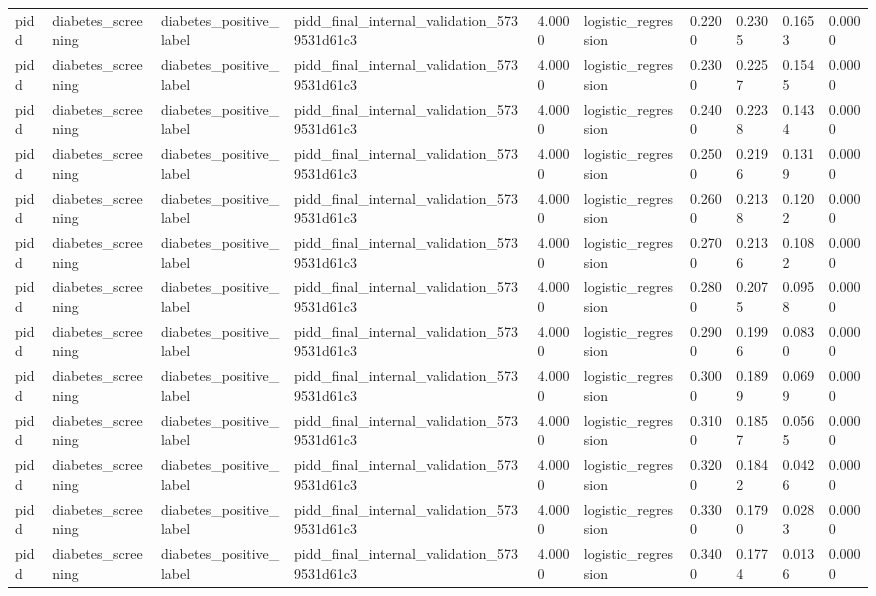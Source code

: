 \begin{tabular}{llllllllll}
pidd & diabetes\_screening & diabetes\_positive\_label & pidd\_final\_internal\_validation\_5739531d61c3 & 4.0000 & logistic\_regression & 0.2200 & 0.2305 & 0.1653 & 0.0000 \\
pidd & diabetes\_screening & diabetes\_positive\_label & pidd\_final\_internal\_validation\_5739531d61c3 & 4.0000 & logistic\_regression & 0.2300 & 0.2257 & 0.1545 & 0.0000 \\
pidd & diabetes\_screening & diabetes\_positive\_label & pidd\_final\_internal\_validation\_5739531d61c3 & 4.0000 & logistic\_regression & 0.2400 & 0.2238 & 0.1434 & 0.0000 \\
pidd & diabetes\_screening & diabetes\_positive\_label & pidd\_final\_internal\_validation\_5739531d61c3 & 4.0000 & logistic\_regression & 0.2500 & 0.2196 & 0.1319 & 0.0000 \\
pidd & diabetes\_screening & diabetes\_positive\_label & pidd\_final\_internal\_validation\_5739531d61c3 & 4.0000 & logistic\_regression & 0.2600 & 0.2138 & 0.1202 & 0.0000 \\
pidd & diabetes\_screening & diabetes\_positive\_label & pidd\_final\_internal\_validation\_5739531d61c3 & 4.0000 & logistic\_regression & 0.2700 & 0.2136 & 0.1082 & 0.0000 \\
pidd & diabetes\_screening & diabetes\_positive\_label & pidd\_final\_internal\_validation\_5739531d61c3 & 4.0000 & logistic\_regression & 0.2800 & 0.2075 & 0.0958 & 0.0000 \\
pidd & diabetes\_screening & diabetes\_positive\_label & pidd\_final\_internal\_validation\_5739531d61c3 & 4.0000 & logistic\_regression & 0.2900 & 0.1996 & 0.0830 & 0.0000 \\
pidd & diabetes\_screening & diabetes\_positive\_label & pidd\_final\_internal\_validation\_5739531d61c3 & 4.0000 & logistic\_regression & 0.3000 & 0.1899 & 0.0699 & 0.0000 \\
pidd & diabetes\_screening & diabetes\_positive\_label & pidd\_final\_internal\_validation\_5739531d61c3 & 4.0000 & logistic\_regression & 0.3100 & 0.1857 & 0.0565 & 0.0000 \\
pidd & diabetes\_screening & diabetes\_positive\_label & pidd\_final\_internal\_validation\_5739531d61c3 & 4.0000 & logistic\_regression & 0.3200 & 0.1842 & 0.0426 & 0.0000 \\
pidd & diabetes\_screening & diabetes\_positive\_label & pidd\_final\_internal\_validation\_5739531d61c3 & 4.0000 & logistic\_regression & 0.3300 & 0.1790 & 0.0283 & 0.0000 \\
pidd & diabetes\_screening & diabetes\_positive\_label & pidd\_final\_internal\_validation\_5739531d61c3 & 4.0000 & logistic\_regression & 0.3400 & 0.1774 & 0.0136 & 0.0000 \\

\end{tabular}
